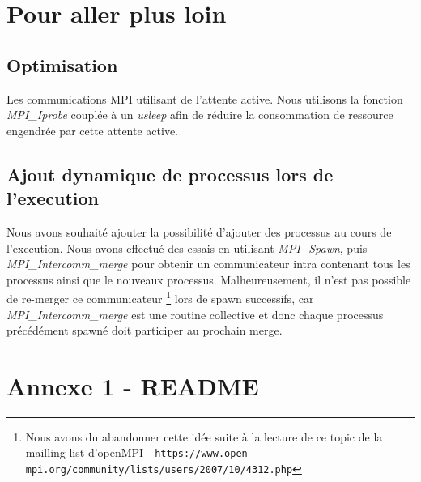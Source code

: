 \documentclass[a4paper, 11pt, french]{article}
\begin{document}
\section{Pour aller plus loin}
\subsection {Optimisation}
Les communications MPI utilisant de l'attente active. Nous utilisons la fonction \textit{MPI_Iprobe} couplée à un \textit{usleep} afin de réduire la consommation de ressource engendrée par cette attente active.

\subsection {Ajout dynamique de processus lors de l'execution}
Nous avons souhaité ajouter la possibilité d'ajouter des processus au cours de l'execution. Nous avons effectué des essais en utilisant \textit{MPI\_Spawn}, puis \textit{MPI\_Intercomm\_merge} pour obtenir un communicateur intra contenant tous les processus ainsi que le nouveaux processus. Malheureusement, il n'est pas possible de re-merger ce communicateur \footnote{Nous avons du abandonner cette idée suite à la lecture de ce topic de la mailling-list d'openMPI - \texttt{https://www.open-mpi.org/community/lists/users/2007/10/4312.php}} lors de spawn successifs, car \textit{MPI\_Intercomm\_merge} est une routine collective et donc chaque processus précédément spawné doit participer au prochain merge.

\appendix %
\section{Annexe 1 - README}

\end{document}
